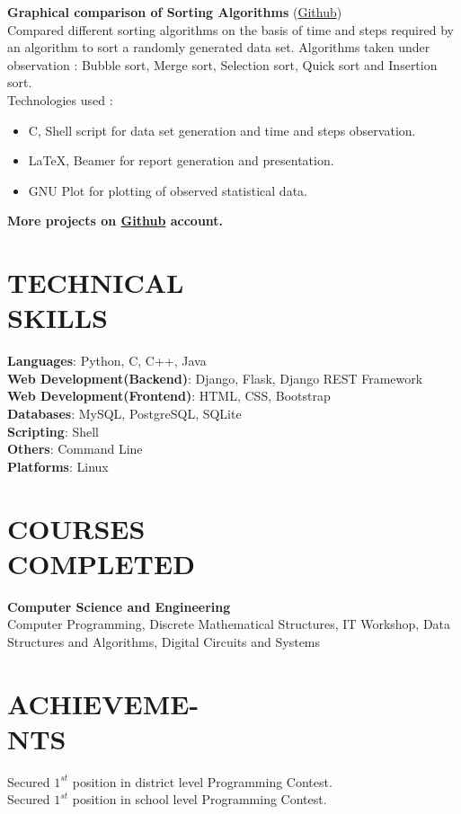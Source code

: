 \documentclass[margin]{res}
\begin{document}
\begin{resume}
   {\textbf{Graphical comparison of Sorting Algorithms}} (\href{https://github.com/gauravkulkarni96/compare-sorting-algorithms}{Github})\\
    Compared different sorting algorithms on the basis of time and steps required by an algorithm to sort a randomly generated data set. Algorithms taken under observation : Bubble sort, Merge sort, Selection sort, Quick sort and Insertion sort.\\
Technologies used :
    \begin{itemize} \itemsep -2pt
     \item C, Shell script for data set generation and time and steps observation.
     \item \LaTeX, Beamer for report generation and presentation.
     \item GNU Plot for plotting of observed statistical data.
     \end{itemize}
 \textbf{More projects on \href{https://github.com/gauravkulkarni96}{Github} account.}


\section{TECHNICAL \\ SKILLS} {\textbf{Languages}:} Python, C, C++, Java\\
	{\textbf{Web Development(Backend)}:} Django, Flask, Django REST Framework\\
    {\textbf{Web Development(Frontend)}:} HTML, CSS, Bootstrap\\
    {\textbf{Databases}:} MySQL, PostgreSQL, SQLite\\
    {\textbf{Scripting}:} Shell\\
    {\textbf{Others}:} Command Line\\
    {\textbf{Platforms}:} Linux



\section{COURSES \\ COMPLETED} {\textbf{Computer Science and Engineering}}\\
Computer Programming, Discrete Mathematical Structures, IT Workshop, Data Structures and Algorithms, Digital Circuits and Systems\\

\section{ACHIEVEME-\\NTS}
    Secured $1^{st}$ position in district level Programming Contest.\\
    Secured $1^{st}$ position in school level Programming Contest.\\


\end{resume}
\end{document}
